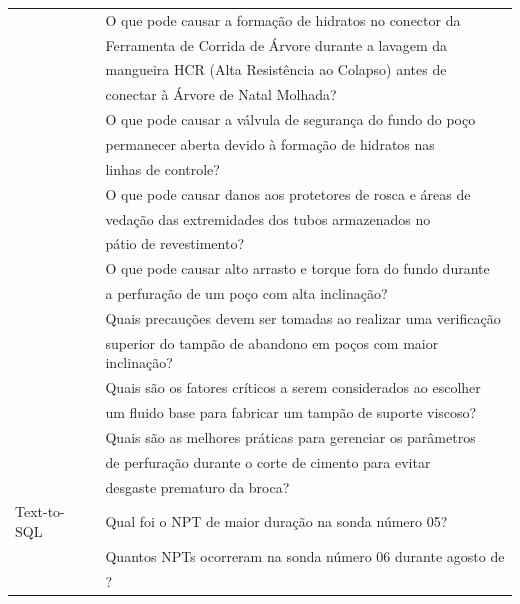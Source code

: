 \begin{table}[h]
\begin{tabular}{l l }
                         & O que pode causar a formação de hidratos no conector da\\ 
                         & \quad Ferramenta de Corrida de Árvore durante a lavagem da\\ 
                         & \quad mangueira HCR (Alta Resistência ao Colapso) antes de\\ 
                         & \quad conectar à Árvore de Natal Molhada? \\ 
                         & O que pode causar a válvula de segurança do fundo do poço\\ 
                         & \quad  permanecer aberta devido à formação de hidratos nas\\ 
                         & \quad  linhas de controle? \\ 
                         & O que pode causar danos aos protetores de rosca e áreas de\\ 
                         & \quad  vedação das extremidades dos tubos armazenados no\\ 
                         & \quad  pátio de revestimento? \\ 
                         & O que pode causar alto arrasto e torque fora do fundo durante\\ 
                         & \quad  a perfuração de um poço com alta inclinação? \\ 
                         & Quais precauções devem ser tomadas ao realizar uma verificação\\ 
                         & \quad  superior do tampão de abandono em poços com maior inclinação? \\ 
                         & Quais são os fatores críticos a serem considerados ao escolher\\ 
                         & \quad  um fluido base para fabricar um tampão de suporte viscoso? \\ 
                         & Quais são as melhores práticas para gerenciar os parâmetros\\ 
                         & \quad  de perfuração durante o corte de cimento para evitar\\ 
                         & \quad  desgaste prematuro da broca? \\ 
            
                    Text-to-SQL & Qual foi o NPT de maior duração na sonda número 05? \\ 
                         & Quantos NPTs ocorreram na sonda número 06 durante agosto de\\ 
                         & \quad  2023? \\ 
                \bottomrule %
                \end{tabular}
                \label{table:question_examples}
            \end{table}
    
